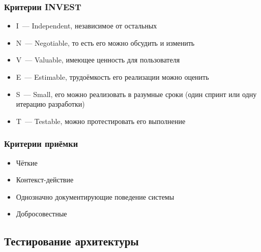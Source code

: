 \documentclass{../../slides-style}
\begin{document}
    \begin{frame}
        \frametitle{Критерии INVEST}
        \begin{itemize}
            \item I~--- Independent, независимое от остальных
            \item N~--- Negotiable, то есть его можно обсудить и изменить
            \item V~--- Valuable, имеющее ценность для пользователя
            \item E~--- Estimable, трудоёмкость его реализации можно оценить
            \item S~--- Small, его можно реализовать в разумные сроки (один спринт или одну итерацию разработки)
            \item T~--- Testable, можно протестировать его выполнение
        \end{itemize}
    \end{frame}

    \begin{frame}
        \frametitle{Критерии приёмки}
        \begin{itemize}
            \item Чёткие
            \item Контекст-действие
            \item Однозначно документирующие поведение системы
            \item Добросовестные
        \end{itemize}
    \end{frame}

    \subsection{Тестирование архитектуры}
\end{document}
